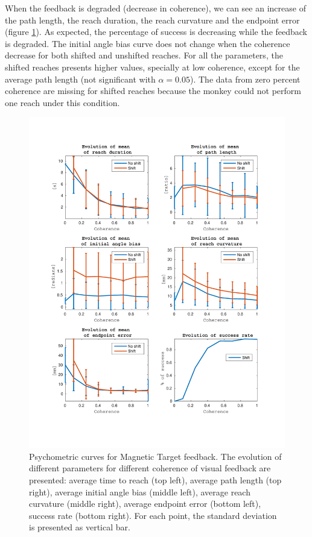 \documentclass[preprint,12pt]{elsarticle}
\begin{document}
When the feedback is degraded (decrease in coherence), we can see an increase of the path length, the reach duration, the reach curvature and the endpoint error (figure \ref{fig:MT_indy}). As expected, the percentage of success is decreasing while the feedback is degraded. The initial angle bias curve does not change when the coherence decrease for both shifted and unshifted reaches. For all the parameters, the shifted reaches presents higher values, specially at low coherence, except for the average path length (not significant with $\alpha = 0.05$). The data from zero percent coherence are missing for shifted reaches because the monkey could not perform one reach under this condition.
\begin{figure}[htbp]
\includegraphics[width=1\textwidth,trim={1.5cm 2.5cm 1.2cm 2.25cm},clip]{figures/MD_psychometric_curve_indy.pdf}
\caption{Psychometric curves for Magnetic Target feedback. The evolution of different parameters for different coherence of visual feedback are presented: average time to reach (top left), average path length (top right), average initial angle bias (middle left), average reach curvature (middle right), average endpoint error (bottom left), success rate (bottom right). For each point, the standard deviation is presented as vertical bar.}
\label{fig:MT_indy}
\end{figure}
\end{document}
